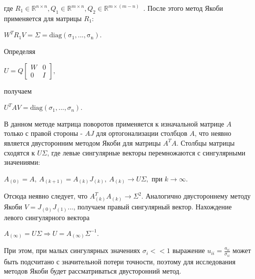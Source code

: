 где $R_1 \in \mathbb{R}^{n\times n}, Q_1 \in \mathbb{R}^{m\times n}, Q_2\in \mathbb{R}^{m\times (m-n)}$~\cite{Golub2013}. После этого метод Якоби применяется для матрицы $R_1$:
\begin{center}
    $W^TR_1V=\Sigma = \mathrm{diag(\sigma_1,...,\sigma_n)}$.
\end{center}
Определяя 
\begin{center}
    $U = Q\begin{bmatrix}
        W&0\\0&I
    \end{bmatrix},$    
\end{center}
получаем
\begin{center}
     $U^TAV = \mathrm{diag}(\sigma_1,...,\sigma_n)$.
\end{center}


В данном методе матрица поворотов применяется к изначальной матрице $A$ только с правой стороны - $AJ$ для ортогонализации столбцов $A$, что неявно является двусторонним методом Якоби для матрицы $A^TA$.
Столбцы матрицы сходятся к $U\Sigma$, где левые сингулярные векторы перемножаются с сингулярными значениями:
\begin{center}
     $A_{(0)}=A,\ A_{(k+1)} = A_{(k)}J_{(k)},\ A_{(k)} \longrightarrow U\Sigma, \text{ при } k\to\infty$.
 \end{center}
 Отсюда неявно следует, что $A^T_{(k)}A_{(k)} \to \Sigma^2$. Аналогично двустороннему методу Якоби $V = J_{(0)}J_{(1)}...$, получаем правый сингулярный вектор. Нахождение левого сингулярного вектора 
 \begin{center}
     $A_{(\infty)} = U\Sigma \Rightarrow U = A_{(\infty)}\Sigma^{-1}.$
 \end{center}

 При этом, при малых сингулярных значениях $\sigma_i<<1$ выражение $u_{ii} = \frac{a_{ii}}{\sigma_{ii}}$ может быть подсчитано с значительной потери точности, поэтому для исследования методов Якоби будет рассматриваться двусторонний метод.

